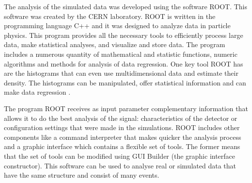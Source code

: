 The analysis of the simulated data was developed using the software ROOT. This software was created by the CERN laboratory. ROOT is written in the programming language C++ and it was 
designed to analyze data in particle physics. This program provides all the necessary tools to efficiently process large data, make statistical analyses, and visualize and store data. The program 
includes a numerous quantity of mathematical and statistic functions, numeric algorithms and methods for analysis of data regression. One key tool ROOT has are the histograms that can even use 
multidimensional data and estimate their density. The histograms can be manipulated, offer statistical information and can make data regression \cite{Root}. 

The program ROOT receives as input parameter complementary information that allows it to do the best analysis of the signal: characteristics of the detector or configuration settings that were 
made in the simulations. ROOT includes other components like a command interpreter that makes quicker the analysis process and a graphic interface which contains a flexible set of tools. The former
means that the set of tools can be modified using GUI Builder (the graphic interface constructor). This software can be used to analyse real or simulated data that have the same structure and 
consist of many events. 


